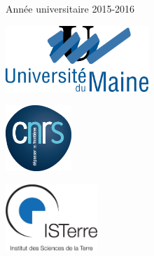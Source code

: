 \documentclass[a4paper,11pt]{report} %
\begin{document}
\begin{titlepage}
\vfill
{\large Année universitaire 2015-2016}\\[3cm] %
 


\begin{minipage}{0.3\textwidth}
	\centering
	\includegraphics[height=2.5cm]{img/univ.png}	
\end{minipage}
\begin{minipage}{0.3\textwidth}
	\centering	
	\includegraphics[height=2.5cm]{img/cnrs.png}
\end{minipage}
\begin{minipage}{0.3\textwidth}
	\centering
	\includegraphics[height=2.5cm]{img/isterre.png}
\end{minipage}

 



\end{titlepage}

\newpage

\vspace{2cm}

{ \hypersetup{hidelinks}
\tableofcontents}











\appendix




\newpage

%

\end{document}
